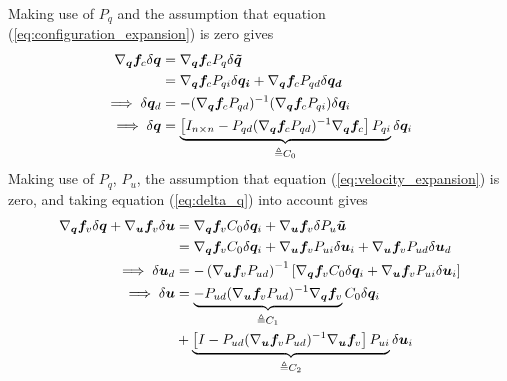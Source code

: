 \documentclass[smallcondensed,final]{svjour3}                     %
\begin{document}
Making use of $P_q$ and the assumption that equation
(\ref{eq:configuration_expansion}) is zero gives
\begin{align}
\nabla_{\bm{q}}\bm{f}_{c} \delta \bm{q} &= \nabla_{\bm{q}}\bm{f}_{c} P_{q} \delta \bm{\tilde{q}} \notag \\
   &= \nabla_{\bm{q}}\bm{f}_{c} P_{qi} \delta \bm{q_i} +
  \nabla_{\bm{q}}\bm{f}_{c} P_{qd} \delta \bm{q_d}\notag\\
  \implies \delta \bm{q}_d &= -(\nabla_{\bm{q}}\bm{f}_{c} P_{qd})^{-1}
  (\nabla_{\bm{q}}\bm{f}_{c} P_{qi}) \delta \bm{q}_i \notag\\
  \label{eq:delta_q}
  \implies \delta \bm{q} &= \underbrace{\left[ I_{n \times n} - P_{qd}(\nabla_{\bm{q}}
  \bm{f}_{c} P_{qd})^{-1} \nabla_{\bm{q}} \bm{f}_{c} \right]
  P_{qi}}_{\triangleq C_0} \delta \bm{q}_i
\end{align}
Making use of $P_q$, $P_u$, the assumption that equation
(\ref{eq:velocity_expansion}) is zero, and taking equation (\ref{eq:delta_q})
into account gives
\begin{align}
\nabla_{\bm{q}}\bm{f}_{v} \delta \bm{q} + \nabla_{\bm{u}}\bm{f}_{v} \delta \bm{u}
  &= \nabla_{\bm{q}} \bm{f}_{v} C_0 \delta \bm{q}_i +\nabla_{\bm{u}} \bm{f}_{v}
  \delta P_u \bm{\tilde{u}} \notag \\
  &=\nabla_{\bm{q}} \bm{f}_{v} C_0 \delta \bm{q}_i + \nabla_{\bm{u}} \bm{f}_{v} P_{ui} \delta \bm{u}_i +
\nabla_{\bm{u}} \bm{f}_{v} P_{ud} \delta \bm{u}_d \notag\\
%
\implies \delta \bm{u}_d &= -\left(\nabla_{\bm{u}} \bm{f}_{v}
P_{ud}\right)^{-1}\left[\nabla_{\bm{q}}\bm{f}_{v} C_0 \delta \bm{q}_i +
  \nabla_{\bm{u}} \bm{f}_{v} P_{ui} \delta \bm{u}_i \right]\notag\\
  \implies \delta \bm{u} &= \underbrace{-P_{ud}(\nabla_{\bm{u}} \bm{f}_{v} P_{ud})^{-1}
  \nabla_{\bm{q}} \bm{f}_{v}}_{\triangleq C_1} C_0 \delta \bm{q}_i \notag\\
  \label{eq:delta_u}
  &+ \underbrace{\left[I - P_{ud} (\nabla_{\bm{u}}\bm{f}_{v} P_{ud})^{-1} \nabla_{\bm{u}}
  \bm{f}_{v} \right] P_{ui}}_{\triangleq C_2} \delta \bm{u}_i
\end{align}
\end{document}
